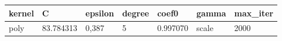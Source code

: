 \begin{tabular}{l}
\toprule
kernel & C & epsilon & degree & coef0 & gamma & max_iter \\
\midrule
poly & 83.784313 & 0,387 & 5 & 0.997070 & scale & 2000 \\
\bottomrule
\end{tabular}
